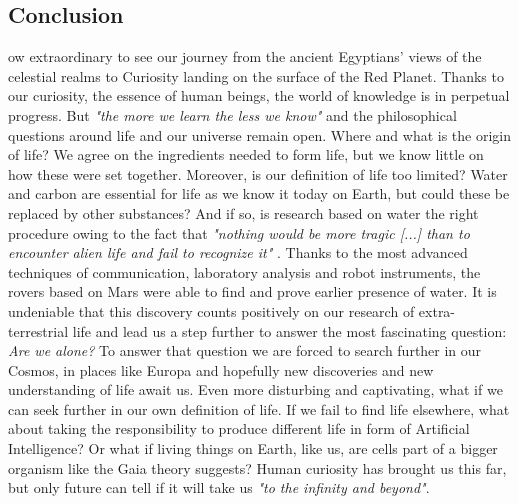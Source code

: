 \subsection{Conclusion}

ow extraordinary to see our journey from the ancient Egyptians' views of the celestial realms to Curiosity landing on the surface of the Red Planet. 
Thanks to our curiosity, the essence of human beings, the world of knowledge is in perpetual progress. 
But \emph{"the more we learn the less we know"} and the philosophical questions around life and our universe remain open.
Where and what is the origin of life? 
We agree on the ingredients needed to form life, but we know little on how these were set together. 
Moreover, is our definition of life too limited? 
Water and carbon are essential for life as we know it today on Earth, but could these be replaced by other substances? 
And if so, is research based on water the right procedure owing to the fact that \emph{"nothing would be more tragic [...] than to encounter alien life and fail to recognize it"} \cite{OForm3}. 
Thanks to the most advanced techniques of communication, laboratory analysis and robot instruments, the rovers based on Mars were able to find and prove earlier presence of water.
It is undeniable that this discovery counts positively on our research of extra-terrestrial life and lead us a step further to answer the most fascinating question: \emph{Are we alone?} 
To answer that question we are forced to search further in our Cosmos, in places like Europa and hopefully new discoveries and new understanding of life await us. 
Even more disturbing and captivating, what if we can seek further in our own definition of life. 
If we fail to find life elsewhere, what about taking the responsibility to produce different life in form of Artificial Intelligence? 
Or what if living things on Earth, like us, are cells part of a bigger organism like the Gaia theory suggests?
Human curiosity has brought us this far, but only future can tell if it will take us \emph{"to the infinity and beyond"}.